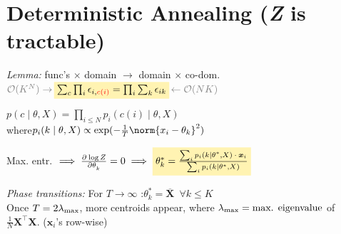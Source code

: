 \section{Deterministic Annealing
\hfill\normalfont\sffamily (\textit{\rmfamily Z} is tractable)}

\emph{Lemma:}\enspace
func's $\times$ domain $\to$ domain $\times$ co-dom.\\
\quad $\textcolor{gray}{\mathcal O(K^N) \rightarrow\,}
\highlight{\sum_c \prod_i \epsilon_{i, \color{red} c(i)} = \prod_i \sum_k \epsilon_{ik}}
\textcolor{gray}{\,\leftarrow \mathcal O(NK)}$

$p(c\mid \theta, X) = \prod_{i\leq N} p_i(c(i) \mid \theta,X)$\\
\quad where\enskip $p_i(k\mid \theta, X) \propto \exp(-\frac1T \norm{x_i - \theta_k}^2)$

Max. entr.
$\implies \pderiv{\log Z}{\theta_k} = 0
\implies \highlight{\theta_k^\ast = \frac{ \sum_i p_i(k\mid \theta^\ast, X) \:\cdot\: \bm x_i }{ \sum_i p_i(k\mid \theta^\ast, X) }}$


\emph{Phase transitions:}\enspace
For $T {\to} \infty$ :\enspace $\theta_k^\ast = \overline{\bm X} \enspace \forall k\leq K$\\
Once $T=2\lambda_\mathrm{max}$, more centroids appear, where $\lambda_\mathrm{max} = \textrm{max. eigenvalue}$ of $\frac1N \bm X^\top \bm X$.
\enspace($\bm x_i$'s row-wise)